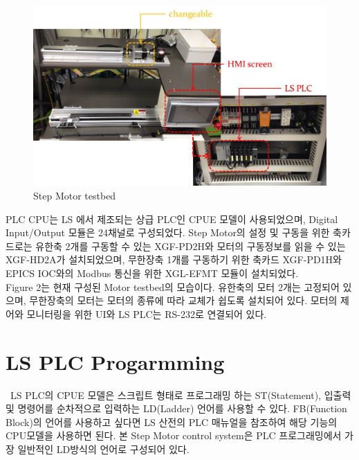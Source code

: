 \documentclass[11pt
  , a4paper
  , article
  , oneside
]{memoir}
\begin{document}
\begin{figure}[h]
	\centering
	\includegraphics[width=0.8 \textwidth]{./picture/TESTBED_1.jpg}
	\caption{
		Step Motor testbed
	}
	\label{fig:}
\end{figure}

PLC CPU는 LS 에서 제조되는 상급 PLC인 CPUE 모델이 사용되었으며, Digital Input/Output 모듈은 24채널로 구성되었다. Step Motor의 설정 및 구동을 위한 축카드로는 유한축 2개를 구동할 수 있는 XGF-PD2H와 모터의 구동정보를 읽을 수 있는 XGF-HD2A가 설치되었으며, 무한장축 1개를 구동하기 위한 축카드 XGF-PD1H와 EPICS IOC와의 Modbus 통신을 위한 XGL-EFMT 모듈이 설치되었다. \\

Figure 2는 현재 구성된 Motor testbed의 모습이다. 유한축의 모터 2개는 고정되어 있으며, 무한장축의 모터는 모터의 종류에 따라 교체가 쉽도록 설치되어 있다. 모터의 제어와 모니터링을 위한 UI와 LS PLC는 RS-232로 연결되어 있다.

\newpage

\chapter{LS PLC Progarmming}\
 LS PLC의 CPUE 모델은 스크립트 형태로 프로그래밍 하는 ST(Statement), 입출력 및 명령어를 순차적으로 입력하는 LD(Ladder) 언어를 사용할 수 있다. FB(Function Block)의 언어를 사용하고 싶다면 LS 산전의 PLC 매뉴얼을 참조하여 해당 기능의 CPU모델을 사용하면 된다. 본 Step Motor control system은 PLC 프로그래밍에서 가장 일반적인 LD방식의 언어로 구성되어 있다. 
\end{document}
